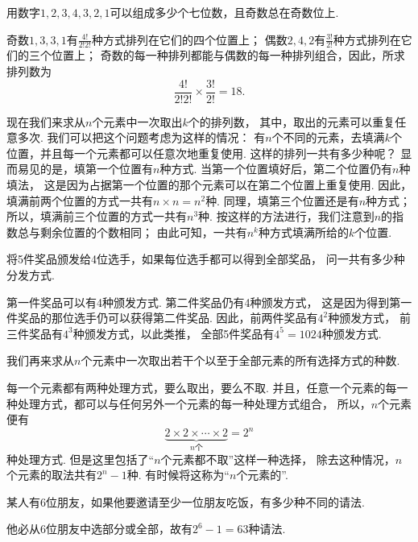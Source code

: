 \begin{example}
用数字\(1,2,3,4,3,2,1\)可以组成多少个七位数，且奇数总在奇数位上.
\begin{solution}
奇数\(1,3,3,1\)有\(\frac{4!}{2! 2!}\)种方式排列在它们的四个位置上；
偶数\(2,4,2\)有\(\frac{3!}{2!}\)种方式排列在它们的三个位置上；
奇数的每一种排列都能与偶数的每一种排列组合，因此，所求排列数为\begin{equation*}
	\frac{4!}{2! 2!} \times \frac{3!}{2!} = 18.
\end{equation*}
\end{solution}
\end{example}

现在我们来求从\(n\)个元素中一次取出\(k\)个的排列数，
其中，取出的元素可以重复任意多次.
我们可以把这个问题考虑为这样的情况：
有\(n\)个不同的元素，去填满\(k\)个位置，并且每一个元素都可以任意次地重复使用.
这样的排列一共有多少种呢？
显而易见的是，填第一个位置有\(n\)种方式.
当第一个位置填好后，第二个位置仍有\(n\)种填法，
这是因为占据第一个位置的那个元素可以在第二个位置上重复使用.
因此，填满前两个位置的方式一共有\(n \times n = n^2\)种.
同理，填第三个位置还是有\(n\)种方式；
所以，填满前三个位置的方式一共有\(n^3\)种.
按这样的方法进行，我们注意到\(n\)的指数总与剩余位置的个数相同；
由此可知，一共有\(n^k\)种方式填满所给的\(k\)个位置.

\begin{example}
将5件奖品颁发给4位选手，如果每位选手都可以得到全部奖品，
问一共有多少种分发方式.
\begin{solution}
第一件奖品可以有4种颁发方式.
第二件奖品仍有4种颁发方式，
这是因为得到第一件奖品的那位选手仍可以获得第二件奖品.
因此，前两件奖品有\(4^2\)种颁发方式，
前三件奖品有\(4^3\)种颁发方式，以此类推，
全部5件奖品有\(4^5=1024\)种颁发方式.
\end{solution}
\end{example}

我们再来求从\(n\)个元素中一次取出若干个以至于全部元素的所有选择方式的种数.

每一个元素都有两种处理方式，要么取出，要么不取.
并且，任意一个元素的每一种处理方式，都可以与任何另外一个元素的每一种处理方式组合，
所以，\(n\)个元素便有\begin{equation*}
	\underbrace{2 \times 2 \times \dotsm \times 2}_{\text{$n$个}}
	= 2^n
\end{equation*}种处理方式.
但是这里包括了“\(n\)个元素都不取”这样一种选择，
除去这种情况，\(n\)个元素的取法共有\(2^n-1\)种.
有时候将这称为“\(n\)个元素的”.

\begin{example}
某人有6位朋友，如果他要邀请至少一位朋友吃饭，有多少种不同的请法.
\begin{solution}
他必从6位朋友中选部分或全部，故有\(2^6-1=63\)种请法.
\end{solution}
\end{example}

